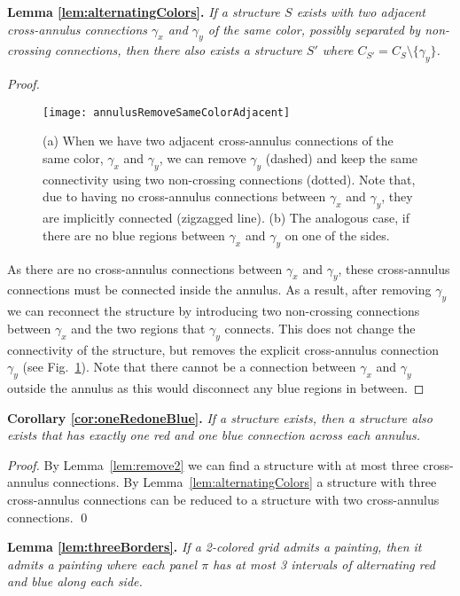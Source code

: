 \documentclass[runningheads]{llncs}
\newcommand{\cloneclaim}[2]{\medskip\noindent\textbf{#1.} \emph{#2}\smallskip}
\begin{document}
\cloneclaim{Lemma \ref{lem:alternatingColors}}{If a structure $S$ exists with two adjacent cross-annulus connections $\gamma_x$ and $\gamma_y$ of the same color, possibly separated by non-crossing connections, then there also exists a structure $S'$ where $C_{S'}=C_S\setminus \{\gamma_y\}$.}
\begin{proof}
    \begin{figure}[h]
	\centering
		\texttt{[image: annulusRemoveSameColorAdjacent]}
		\caption{(a) When we have two adjacent cross-annulus connections of the same color, $\gamma_x$ and $\gamma_y$, we can remove $\gamma_y$ (dashed) and keep the same connectivity using two non-crossing connections (dotted). Note that, due to having no cross-annulus connections between $\gamma_x$ and $\gamma_y$, they are implicitly connected (zigzagged line). (b) The analogous case, if there are no blue regions between $\gamma_x$ and $\gamma_y$ on one of the sides.}
		\label{fig:annulusRemoveSameColorAdjacent}
	\end{figure}
    As there are no cross-annulus connections between $\gamma_x$ and $\gamma_y$, these cross-annulus connections must be connected inside the annulus.
    As a result, after removing $\gamma_y$ we can reconnect the structure by introducing two non-crossing connections between $\gamma_x$ and the two regions that $\gamma_y$ connects.
    This does not change the connectivity of the structure, but removes the explicit cross-annulus connection $\gamma_y$ (see Fig.~\ref{fig:annulusRemoveSameColorAdjacent}).
    Note that there cannot be a connection between $\gamma_x$ and $\gamma_y$ outside the annulus as this would disconnect any blue regions in between.
\end{proof}

\cloneclaim{Corollary \ref{cor:oneRedoneBlue}}{If a structure exists, then a structure also exists that has exactly one red and one blue connection across each annulus.}
\begin{proof}
By Lemma~\ref{lem:remove2} we can find a structure with at most three cross-annulus connections. By Lemma~\ref{lem:alternatingColors} a structure with three cross-annulus connections can be reduced to a structure with two cross-annulus connections.
\hfill\qed
\end{proof}

\cloneclaim{Lemma \ref{lem:threeBorders}}{If a 2-colored grid admits a painting, then it admits a painting where each panel $\pi$ has at most 3 intervals of alternating red and blue along each side.}
\end{document}
